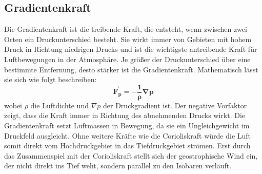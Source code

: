 \subsection{Gradientenkraft
\label{geostrophisch:subsection:finibus}}
Die Gradientenkraft ist die treibende Kraft, die entsteht, wenn zwischen zwei Orten ein Druckunterschied besteht. Sie wirkt immer von Gebieten mit hohem Druck in Richtung niedrigen Drucks und ist die wichtigste antreibende Kraft für Luftbewegungen in der Atmosphäre. Je größer der Druckunterschied über eine bestimmte Entfernung, desto stärker ist die Gradientenkraft.
Mathematisch lässt sie sich wie folgt beschreiben:
\begin{equation}
\boldsymbol{
\vec{F}_p 
= 
-\frac{1}{\rho} \nabla p
}
\label{geostrophisch:equation3}
\end{equation}
wobei $\rho$ die Luftdichte und $\nabla p$ der Druckgradient ist. 
Der negative Vorfaktor zeigt, dass die Kraft immer in Richtung des abnehmenden Drucks wirkt.
Die Gradientenkraft setzt Luftmassen in Bewegung, da sie ein Ungleichgewicht im Druckfeld ausgleicht. Ohne weitere Kräfte wie die Corioliskraft würde die Luft somit direkt vom Hochdruckgebiet in das Tiefdruckgebiet strömen. Erst durch das Zusammenspiel mit der Corioliskraft stellt sich der geostrophische Wind ein, der nicht direkt ins Tief weht, sondern parallel zu den Isobaren verläuft.



